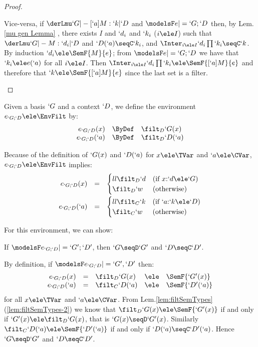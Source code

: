 \documentclass{CSML}
\begin{document}
\begin{proof}
\begin{description}
Vice-versa, if $ \derLmu `G |- [`a]M : `k | `D $ and $\modelsF e |= `G;`D $ then, by Lem.\skp\ref{mu gen Lemma}%
, there exists $I$ and $`d_i$ and $`k_i$ ($i \ele I$) such that $ \derLmu `G |- M : `d_i | `D $ and $`D(`a) \seqC `k_i $, and $\Inter_{i \ele I} `d_i\prod `k_i \seqC `k$.
By induction $`d_i \ele \SemF { M }{ e }$; from $\modelsF e |= `G;`D $ we have that $`k_i \ele e(`a)$ for all $i \ele I$.
Then $\Inter_{i \ele I}`d_i\prod `k_i \ele \SemF { [`a]M}{ e }$ and therefore that $`k \ele \SemF { [`a]M}{ e }$ since the last set is a filter.
\qedhere

 \end{description}
 \end{proof}


 \begin{defi} \label{def:e_GD }
Given a basis $`G$ and a context $`D $, we define the environment $e_{`G;`D } \ele \EnvFilt$ by: 
%
 \[ \begin{array}{rcl}
e_{`G;`D }(x) &\ByDef& \filt_D `G(x) \\
e_{`G;`D }(`a) &\ByDef& \filt_D `D(`a)
 \end{array} \]
 \end{defi}

Because of the definition of $`G(x)$ and $`D(`a)$ for $x\ele \TVar$ and $`a\ele \CVar$, $e_{`G;`D } \ele \EnvFilt$ implies:
%
 \[ \begin{array}{rcl}
e_{`G;`D }(x) &=& 
 \begin{cases}{ll}
	\filt_D `d & (\textrm{if }x{:}`d \ele `G) \\
	\filt_D `w & (\textrm{otherwise})
 \end{cases}
\\ [4mm]
e_{`G;`D }(`a) &=& 
 \begin{cases}{ll}
	\filt_C `k & (\textrm{if }`a{:}`k \ele `D) \\
	\filt_C `w & (\textrm{otherwise})
 \end{cases}
 \end{array} \]

For this environment, we can show:

 \begin{lem} \label{lem:EnvStrength}
If $ \modelsF e_{`G;`D } |= `G';`D' $, then $ `G\seqD`G' $ and $ `D\seqC`D'$.
 \end{lem}

 \begin{Proof}
By definition, if $\modelsF e_{`G;`D } |= `G',`D' $ then:
%
 \[ \begin{array}{rclcl}
e_{`G;`D }(x) &=& \filt_D `G(x) &\ele& \SemF { `G'(x) } \\
e_{`G;`D }(`a) &=& \filt_C `D(`a) &\ele& \SemF { `D'(`a) }
 \end{array} \] 
for all $x\ele \TVar$ and $`a\ele \CVar$.
From Lem.\skp\ref{lem:filtSemTypes}\,(\ref{lem:filtSemTypes-2}) we know that
$\filt_D `G(x) \ele \SemF { `G'(x) }$ if and only if $`G'(x) \ele \filt_D `G(x)$, that is $`G(x) \seqD `G'(x)$. 
Similarly $\filt_C `D(`a) \ele \SemF { `D'(`a) }$ if and only if $`D(`a)\seqC`D'(`a)$. Hence $`G\seqD`G'$ and $`D\seqC`D'$.
 \end{Proof}
\end{document}
